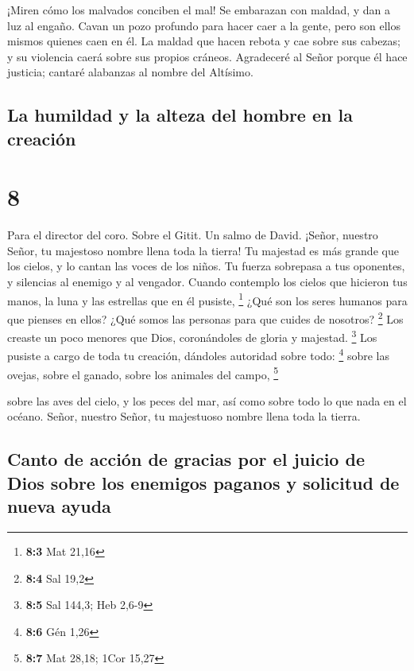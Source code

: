  ¡Miren cómo los malvados conciben el mal! Se embarazan con
maldad, y dan a luz al engaño.  Cavan un pozo profundo para
hacer caer a la gente, pero son ellos mismos quienes caen en él.
 La maldad que hacen rebota y cae sobre sus cabezas; y su
violencia caerá sobre sus propios cráneos.  Agradeceré al
Señor porque él hace justicia; cantaré alabanzas al nombre del Altísimo.

\hypertarget{la-humildad-y-la-alteza-del-hombre-en-la-creaciuxf3n}{%
\subsection{La humildad y la alteza del hombre en la
creación}\label{la-humildad-y-la-alteza-del-hombre-en-la-creaciuxf3n}}

\hypertarget{section-7}{%
\section{8}\label{section-7}}

Para el director del coro. Sobre el Gitit. Un salmo de David.
 ¡Señor, nuestro Señor, tu majestoso nombre llena toda la
tierra! Tu majestad es más grande que los cielos,  y lo
cantan las voces de los niños. Tu fuerza sobrepasa a tus oponentes, y
silencias al enemigo y al vengador.  Cuando contemplo los
cielos que hicieron tus manos, la luna y las estrellas que en él
pusiste, \footnote{\textbf{8:3} Mat 21,16}  ¿Qué son los
seres humanos para que pienses en ellos? ¿Qué somos las personas para
que cuides de nosotros? \footnote{\textbf{8:4} Sal 19,2} 
Los creaste un poco menores que Dios, coronándoles de gloria y majestad.
\footnote{\textbf{8:5} Sal 144,3; Heb 2,6-9}  Los pusiste a
cargo de toda tu creación, dándoles autoridad sobre todo: \footnote{\textbf{8:6}
  Gén 1,26}  sobre las ovejas, sobre el ganado, sobre los
animales del campo, \footnote{\textbf{8:7} Mat 28,18; 1Cor 15,27}

 sobre las aves del cielo, y los peces del mar, así como
sobre todo lo que nada en el océano.  Señor, nuestro Señor,
tu majestuoso nombre llena toda la tierra.

\hypertarget{canto-de-acciuxf3n-de-gracias-por-el-juicio-de-dios-sobre-los-enemigos-paganos-y-solicitud-de-nueva-ayuda}{%
\subsection{Canto de acción de gracias por el juicio de Dios sobre los
enemigos paganos y solicitud de nueva
ayuda}\label{canto-de-acciuxf3n-de-gracias-por-el-juicio-de-dios-sobre-los-enemigos-paganos-y-solicitud-de-nueva-ayuda}}

